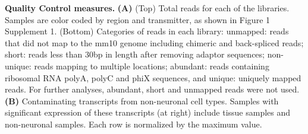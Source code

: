 \textbf{Quality Control measures.} \textbf{(A)} (Top) Total reads for each of the libraries. Samples are color coded by region and transmitter, as shown in Figure 1 Supplement 1. (Bottom) Categories of reads in each library: unmapped: reads that did not map to the mm10 genome including chimeric and back-spliced reads; short: reads less than 30bp in length after removing adaptor sequences; non-unique: reads mapping to multiple locations; abundant: reads containing ribosomal RNA polyA, polyC and phiX sequences, and unique: uniquely mapped reads. For further analyses, abundant, short and unmapped reads were not used.
\textbf{(B)} Contaminating transcripts from non-neuronal cell types. Samples with significant expression of these transcripts (at right) include tissue samples and non-neuronal samples. Each row is normalized by the maximum value. 
